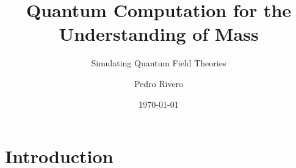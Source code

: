 \documentclass[9pt, handout, aspectratio=169]{beamer}	%
\title{Quantum Computation for the Understanding of Mass}
\subtitle{Simulating Quantum Field Theories}
\author{Pedro Rivero}
\institute{Illinois Institute of Technology \\ Argonne National Laboratory}
\date{\today}
\begin{document}
	\justify
	\setlength{\abovedisplayskip}{0pt}
	\setlength{\belowdisplayskip}{12pt}
	\setlength{\abovedisplayshortskip}{0pt}
	\setlength{\belowdisplayshortskip}{12pt}

\begin{frame}[plain,t]
	\titlepage
\end{frame}




\section{Introduction}
\end{document}
